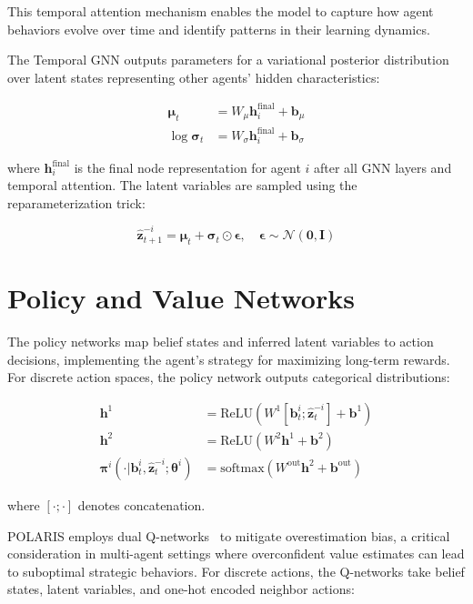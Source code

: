This temporal attention mechanism enables the model to capture how agent behaviors evolve over time and identify patterns in their learning dynamics.

The Temporal GNN outputs parameters for a variational posterior distribution over latent states representing other agents' hidden characteristics:

\begin{align}
    \boldsymbol{\mu}_t &= W_{\mu}\mathbf{h}^{\text{final}}_i + \mathbf{b}_{\mu} \\
    \log\boldsymbol{\sigma}_t &= W_{\sigma}\mathbf{h}^{\text{final}}_i + \mathbf{b}_{\sigma}
\end{align}

where $\mathbf{h}^{\text{final}}_i$ is the final node representation for agent $i$ after all GNN layers and temporal attention. The latent variables are sampled using the reparameterization trick:

\begin{equation}
    \hat{\mathbf{z}}^{-i}_{t+1} = \boldsymbol{\mu}_t + \boldsymbol{\sigma}_t \odot \boldsymbol{\epsilon}, \quad \boldsymbol{\epsilon} \sim \mathcal{N}(\mathbf{0}, \mathbf{I})
\end{equation}

\section{Policy and Value Networks}

The policy networks map belief states and inferred latent variables to action decisions, implementing the agent's strategy for maximizing long-term rewards. For discrete action spaces, the policy network outputs categorical distributions:

\begin{align}
    \mathbf{h}^1 &= \text{ReLU}(W^1[\mathbf{b}^i_t; \hat{\mathbf{z}}^{-i}_t] + \mathbf{b}^1) \\
    \mathbf{h}^2 &= \text{ReLU}(W^2\mathbf{h}^1 + \mathbf{b}^2) \\
    \boldsymbol{\pi}^i(\cdot|\mathbf{b}^i_t, \hat{\mathbf{z}}^{-i}_t; \boldsymbol{\theta}^i) &= \text{softmax}(W^{\text{out}}\mathbf{h}^2 + \mathbf{b}^{\text{out}})
\end{align}

where $[\cdot; \cdot]$ denotes concatenation.

POLARIS employs dual Q-networks~\cite{hasselt2016deep} to mitigate overestimation bias, a critical consideration in multi-agent settings where overconfident value estimates can lead to suboptimal strategic behaviors. For discrete actions, the Q-networks take belief states, latent variables, and one-hot encoded neighbor actions:

